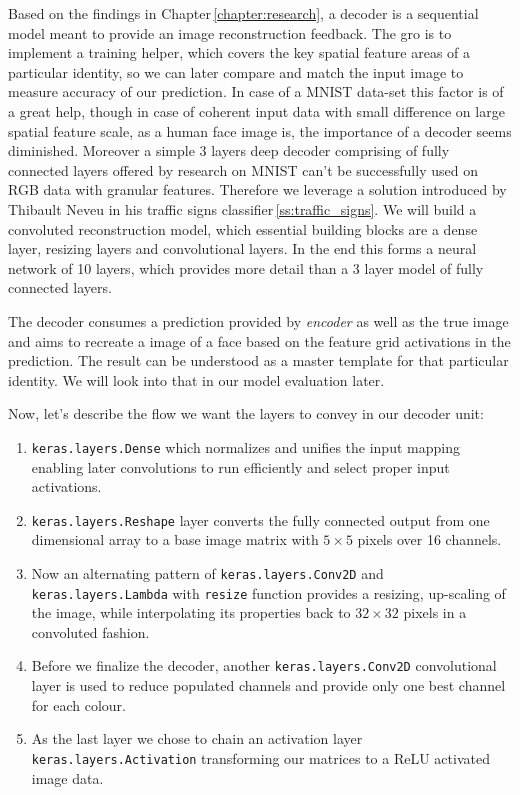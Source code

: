 Based on the findings in Chapter\,\ref{chapter:research}, a decoder is a sequential model meant to provide an image reconstruction feedback. The gro is to implement a training helper, which covers the key spatial feature areas of a particular identity, so we can later compare and match the input image to measure accuracy of our prediction. In case of a MNIST data-set this factor is of a great help, though in case of coherent input data with small difference on large spatial feature scale, as a human face image is, the importance of a decoder seems diminished. Moreover a simple 3 layers deep decoder comprising of fully connected layers offered by research on MNIST can't be successfully used on RGB data with granular features. Therefore we leverage a solution introduced by Thibault Neveu in his traffic signs classifier\,\ref{ss:traffic_signs}. We will build a convoluted reconstruction model, which essential building blocks are a dense layer, resizing layers and convolutional layers. In the end this forms a neural network of 10 layers, which provides more detail than a 3 layer model of fully connected layers.

The decoder consumes a prediction provided by \textit{encoder} as well as the true image and aims to recreate a image of a face based on the feature grid activations in the prediction. The result can be understood as a master template for that particular identity. We will look into that in our model evaluation later.

Now, let's describe the flow we want the layers to convey in our decoder unit:

\begin{enumerate}
    \item \texttt{keras.layers.Dense} which normalizes and unifies the input mapping enabling later convolutions to run efficiently and select proper input activations.
    \item \texttt{keras.layers.Reshape} layer converts the fully connected output from one dimensional array to a base image matrix with $5\times5$ pixels over 16 channels.
    \item Now an alternating pattern of \texttt{keras.layers.Conv2D} and \texttt{keras.layers.Lambda} with \texttt{resize} function provides a resizing, up-scaling of the image, while interpolating its properties back to $32\times32$ pixels in a convoluted fashion.
    \item Before we finalize the decoder, another \texttt{keras.layers.Conv2D} convolutional layer is used to reduce populated channels and provide only one best channel for each colour.
    \item As the last layer we chose to chain an activation layer \texttt{keras.layers.Activation} transforming our matrices to a ReLU activated image data.
\end{enumerate}

